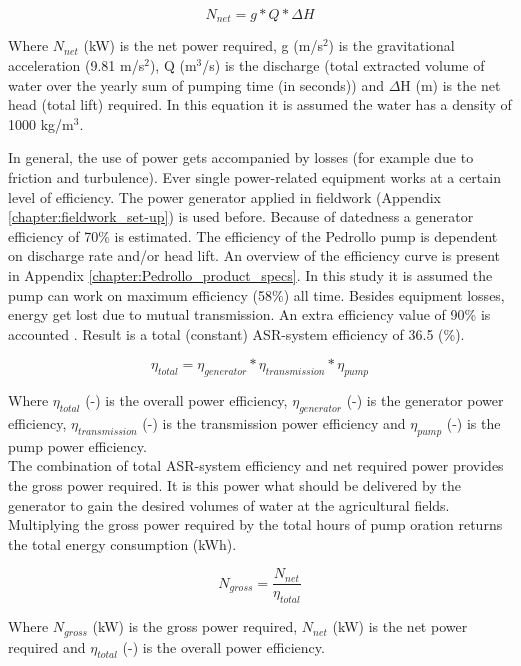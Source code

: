 \begin{equation}
N_{net} =  g * Q * \Delta H
\label{N_net}
\end{equation}

Where $N_{net}$ (kW) is the net power required, g (m/s$^2$) is the gravitational acceleration (9.81 m/s$^2$), Q (m$^3$/s) is the discharge (total extracted volume of water over the yearly sum of pumping time (in seconds)) and $\Delta$H (m) is the net head (total lift) required. In this equation it is assumed the water has a density of 1000 kg/m$^3$.

In general, the use of power gets accompanied by losses (for example due to friction and turbulence). Ever single power-related equipment works at a certain level of efficiency. The power generator applied in fieldwork (Appendix \ref{chapter:fieldwork_set-up}) is used before. Because of datedness a generator efficiency of 70\% is estimated. The efficiency of the Pedrollo pump is dependent on discharge rate and/or head lift. An overview of the efficiency curve is present in Appendix \ref{chapter:Pedrollo_product_specs}. In this study it is assumed the pump can work on maximum efficiency (58\%) all time. Besides equipment losses, energy get lost due to mutual transmission. An extra efficiency value of 90\% is accounted \citep{VandeGiesen2013}. Result is a total (constant) ASR-system efficiency of 36.5 (\%).

\begin{equation}
 \eta_{total} =   \eta_{generator} * \eta_{transmission} * \eta_{pump} \end{equation}

Where $\eta_{total}$ (-) is the overall power efficiency, $\eta_{generator}$ (-) is the generator power efficiency, $\eta_{transmission}$ (-) is the transmission power efficiency and $\eta_{pump}$ (-) is the pump power efficiency. \\

The combination of total ASR-system efficiency and net required power provides the gross power required. It is this power what should be delivered by the generator to gain the desired volumes of water at the agricultural fields. Multiplying the gross power required by the total hours of pump oration returns the total energy consumption (kWh).

\begin{equation}
 N_{gross} =   \frac{N_{net}}{\eta_{total}}
\end{equation}

Where $N_{gross}$ (kW) is the gross power required, $N_{net}$ (kW) is the net power required and $\eta_{total}$ (-) is the overall power efficiency. \\

